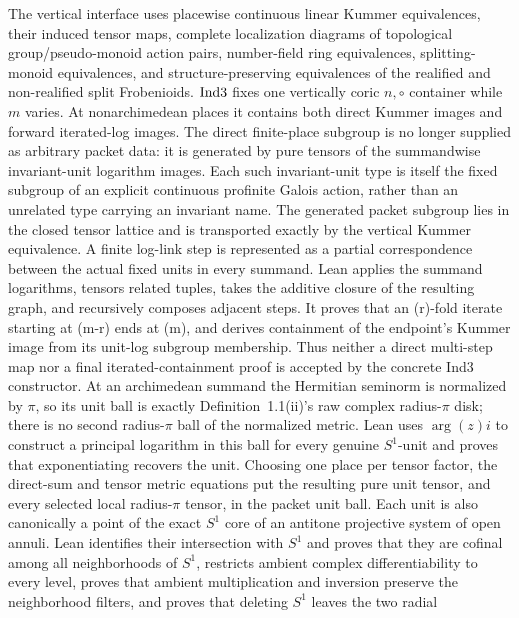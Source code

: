 \begin{definition}
  The vertical interface uses placewise continuous linear Kummer
  equivalences, their induced tensor maps, complete localization diagrams of
  topological group/pseudo-monoid action pairs, number-field ring equivalences,
  splitting-monoid equivalences, and
  structure-preserving equivalences of the realified and non-realified split
  Frobenioids.  \(\mathrm{Ind3}\) fixes one vertically coric \(n,\circ\) container
  while \(m\) varies.  At nonarchimedean places it contains both direct Kummer
  images and forward iterated-log images.  The direct finite-place subgroup is
  no longer supplied as arbitrary packet data: it is generated by pure tensors
  of the summandwise invariant-unit logarithm images.  Each such invariant-unit
  type is itself the fixed subgroup of an explicit continuous profinite Galois
  action, rather than an unrelated type carrying an invariant name.  The
  generated packet subgroup lies in the closed tensor lattice and is
  transported exactly by the vertical Kummer equivalence.  A finite log-link
  step is represented as a partial correspondence between the actual fixed
  units in every summand.  Lean applies the summand logarithms, tensors related
  tuples, takes the additive closure of the resulting graph, and recursively
  composes adjacent steps.  It proves that an (r)-fold iterate starting at
  (m-r) ends at (m), and derives containment of the endpoint's Kummer image
  from its unit-log subgroup membership.  Thus neither a direct multi-step map
  nor a final iterated-containment proof is accepted by the concrete Ind3
  constructor.  At an archimedean summand the Hermitian seminorm is normalized
  by \(\pi\), so its unit ball is exactly Definition~1.1(ii)'s raw complex
  radius-\(\pi\) disk; there is no second radius-\(\pi\) ball of the normalized
  metric.  Lean uses \(\arg(z)i\) to construct a principal logarithm in this
  ball for every genuine \(S^1\)-unit and proves that exponentiating recovers
  the unit.  Choosing one place per tensor factor, the direct-sum and tensor
  metric equations put the resulting pure unit tensor, and every selected
  local radius-\(\pi\) tensor, in the packet unit ball.  Each unit is also
  canonically a point of the exact \(S^1\) core of an antitone projective system
  of open annuli.  Lean identifies their intersection with \(S^1\) and proves
  that they are cofinal among all neighborhoods of \(S^1\), restricts ambient
  complex differentiability to every level, proves that ambient multiplication
  and inversion preserve the neighborhood filters, and proves that deleting
  \(S^1\) leaves the two radial

\end{definition}
